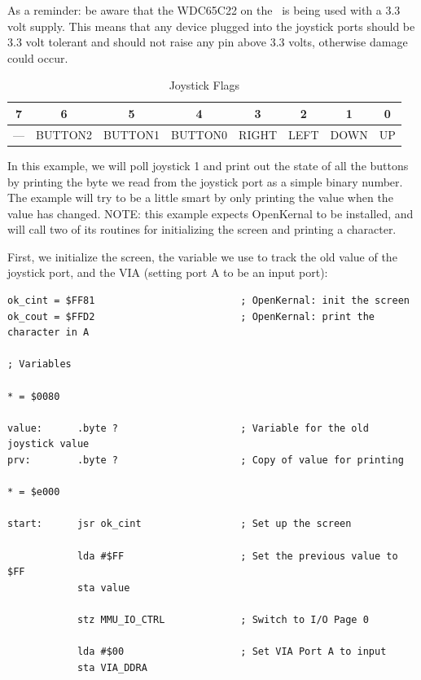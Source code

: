 As a reminder: be aware that the WDC65C22 on the \jr\ is being used with a 3.3 volt supply. This means that any device plugged into the joystick ports should be 3.3 volt tolerant and should not raise any pin above 3.3 volts, otherwise damage could occur.

\begin{table}[ht]
    \begin{center}
        \begin{tabular}{|c|c|c|c|c|c|c|c|} \hline
            7 & 6 & 5 & 4 & 3 & 2 & 1 & 0 \\\hline\hline
            --- & BUTTON2 & BUTTON1 & BUTTON0 & RIGHT & LEFT & DOWN & UP \\ \hline
        \end{tabular}
    \end{center}
    \caption{Joystick Flags}
    \label{tab:via_joystick}
\end{table}

In this example, we will poll joystick 1 and print out the state of all the buttons by printing the byte we read from the joystick port as a simple binary number. The example will try to be a little smart by only printing the value when the value has changed. NOTE: this example expects OpenKernal to be installed, and will call two of its routines for initializing the screen and printing a character.

First, we initialize the screen, the variable we use to track the old value of the joystick port, and the VIA (setting port A to be an input port):
\begin{verbatim}
ok_cint = $FF81                         ; OpenKernal: init the screen
ok_cout = $FFD2                         ; OpenKernal: print the character in A

; Variables

* = $0080

value:      .byte ?                     ; Variable for the old joystick value
prv:        .byte ?                     ; Copy of value for printing

* = $e000

start:      jsr ok_cint                 ; Set up the screen

            lda #$FF                    ; Set the previous value to $FF
            sta value

            stz MMU_IO_CTRL             ; Switch to I/O Page 0

            lda #$00                    ; Set VIA Port A to input
            sta VIA_DDRA
\end{verbatim}

